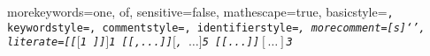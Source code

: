   {
    morekeywords={one, of},
    sensitive=false,
    mathescape=true,
    basicstyle=\footnotesize\tt,
    keywordstyle=\footnotesize\tt,
    commentstyle=\footnotesize\tt,
    identifierstyle=\footnotesize\it,
    morecomment=[s]{`}{'},
    literate={[[}{{$[$}}{1}
             {]]}{{$]$}}{1}
             {[[,...]]}{{$[$, $\ldots]$}}{5}
             {[[...]]}{{$[\ldots]$}}{3}
  }


